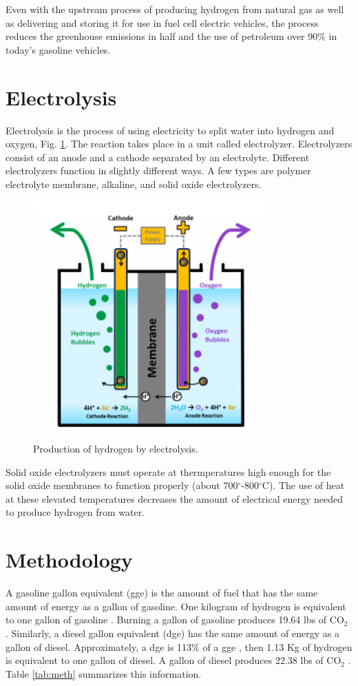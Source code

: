 \documentclass{anstrans}
\begin{document}
Even with the upstream process of producing hydrogen from natural gas as well as delivering and storing it for use in fuel cell electric vehicles, the process reduces the greenhouse emissions in half and the use of petroleum over 90\% in today's gasoline vehicles.

\section{Electrolysis}

Electrolysis is the process of using electricity to split water into hydrogen and oxygen, Fig. \ref{fig:electro}. The reaction takes place in a unit called electrolyzer. Electrolyzers consist of an anode and a cathode separated by an electrolyte. Different electrolyzers function in slightly different ways. A few types are polymer electrolyte membrane, alkaline, and solid oxide electrolyzers.

\begin{figure}[]
	\centering
	\includegraphics[width=0.4\linewidth]{figures/electrolysis.png}
	\hfill
	\caption{Production of hydrogen by electrolysis.}
	\label{fig:electro}
\end{figure}

Solid oxide electrolyzers must operate at thermperatures high enough for the solid oxide membranes to function properly (about 700$^{\circ}$-800$^{\circ}$C). The use of heat at these elevated temperatures decreases the amount of electrical energy needed to produce hydrogen from water.

\section{Methodology}
\label{method}

A gasoline gallon equivalent (gge) is the amount of fuel that has the same amount of energy as a gallon of gasoline. One kilogram of hydrogen is equivalent to one gallon of gasoline \cite{noauthor_hydrogen_nodate}. Burning a gallon of gasoline produces 19.64 lbs of CO$_2$ \cite{noauthor_how_2014}. 
Similarly, a diesel gallon equivalent (dge) has the same amount of energy as a gallon of diesel. Approximately, a dge is 113\% of a gge \cite{noauthor_fuel_2014}, then 1.13 Kg of hydrogen is equivalent to one gallon of diesel.
A gallon of diesel produces 22.38 lbs of CO$_2$ \cite{noauthor_how_2014}. 
Table \ref{tab:meth} summarizes this information.
\end{document}
